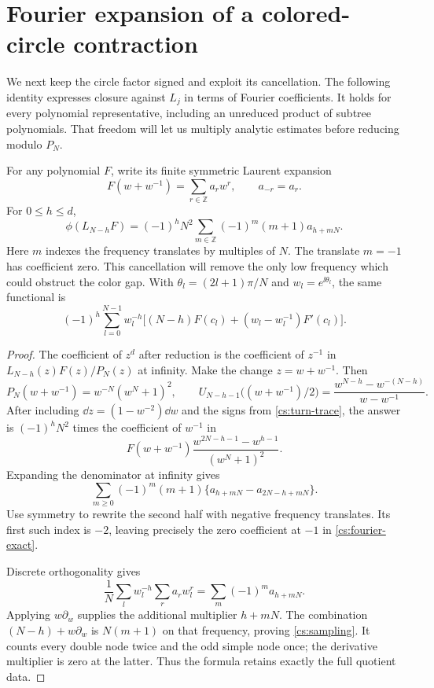 \section{Fourier expansion of a colored-circle contraction}\label{cs:fourier}

We next keep the circle factor signed and exploit its cancellation.
The following identity expresses closure against $L_j$ in terms of
Fourier coefficients. It holds for every polynomial representative,
including an unreduced product of subtree polynomials. That freedom
will let us multiply analytic estimates before reducing modulo $P_N$.

\begin{lemma}\label{cs:character-fourier}
For any polynomial \(F\), write its finite symmetric Laurent expansion
\[
 F(w+w^{-1})=\sum_{r\in\mathbb Z}a_rw^r,\qquad a_{-r}=a_r.
\]
For \(0\le h\le d\),
\begin{equation}\label{cs:fourier-exact}
 \phi(L_{N-h}F)=(-1)^hN^2
      \sum_{m\in\mathbb Z}(-1)^m(m+1)a_{h+mN}.
\end{equation}
Here $m$ indexes the frequency translates by multiples of $N$.
The translate $m=-1$ has coefficient zero. This cancellation will
remove the only low frequency which could obstruct the color gap.
With \(\theta_l=(2l+1)\pi/N\) and \(w_l=e^{\ii\theta_l}\), the same
functional is
\begin{equation}\label{cs:sampling}
 (-1)^h\sum_{l=0}^{N-1}w_l^{-h}
 \bigl[(N-h)F(c_l)+(w_l-w_l^{-1})F'(c_l)\bigr].
\end{equation}
\end{lemma}
\begin{proof}
The coefficient of \(z^d\) after reduction is the coefficient of
\(z^{-1}\) in \(L_{N-h}(z)F(z)/P_N(z)\) at infinity. Make the change
\(z=w+w^{-1}\). Then
\[
 P_N(w+w^{-1})=w^{-N}(w^N+1)^2,\qquad
 U_{N-h-1}\bigl((w+w^{-1})/2\bigr)
    =\frac{w^{N-h}-w^{-(N-h)}}{w-w^{-1}}.
\]
After including \(\dd z=(1-w^{-2})\dd w\) and the signs from
\eqref{cs:turn-trace}, the answer is \((-1)^hN^2\) times the
coefficient of \(w^{-1}\) in
\[
 F(w+w^{-1})\frac{w^{2N-h-1}-w^{h-1}}{(w^N+1)^2}.
\]
Expanding the denominator at infinity gives
\[
 \sum_{m\ge0}(-1)^m(m+1)
       \{a_{h+mN}-a_{2N-h+mN}\}.
\]
Use symmetry to rewrite the second half with negative frequency translates. Its
first such index is \(-2\), leaving precisely the zero coefficient at
\(-1\) in \eqref{cs:fourier-exact}.

Discrete orthogonality gives
\[
 \frac1N\sum_lw_l^{-h}\sum_ra_rw_l^r
      =\sum_m(-1)^m a_{h+mN}.
\]
Applying \(w\partial_w\) supplies the additional multiplier \(h+mN\).
The combination \((N-h)+w\partial_w\) is \(N(m+1)\) on that
frequency, proving \eqref{cs:sampling}. It counts every double node
twice and the odd simple node once; the derivative multiplier is zero
at the latter. Thus the formula retains exactly the full quotient data.
\end{proof}

